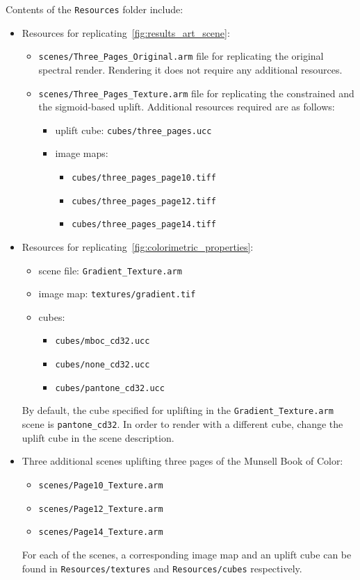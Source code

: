 Contents of the \texttt{Resources} folder include:
\begin{itemize}
	
	\item Resources for replicating~\cref{fig:results_art_scene}:
	\begin{itemize}
		\item \texttt{scenes/Three\_Pages\_Original.arm} file for replicating the original spectral render. Rendering it does not require any additional resources.
		\item \texttt{scenes/Three\_Pages\_Texture.arm} file for replicating the constrained and the sigmoid-based uplift. 
		Additional resources required are as follows:
		\begin{itemize}
			\item uplift cube: \texttt{cubes/three\_pages.ucc}
			\item image maps:
			\begin{itemize}
				\item[] \texttt{cubes/three\_pages\_page10.tiff}
				\item[] \texttt{cubes/three\_pages\_page12.tiff}
				\item[] \texttt{cubes/three\_pages\_page14.tiff}
			\end{itemize}
		\end{itemize}
	\end{itemize}

	\item Resources for replicating~\cref{fig:colorimetric_properties}:
	\begin{itemize}
		\item scene file: \texttt{Gradient\_Texture.arm}
		\item image map: \texttt{textures/gradient.tif}
		\item cubes: 
		\begin{itemize}
			\item[] \texttt{cubes/mboc\_cd32.ucc}
			\item[] \texttt{cubes/none\_cd32.ucc}
			\item[] \texttt{cubes/pantone\_cd32.ucc}
		\end{itemize}
	\end{itemize}
	By default, the cube specified for uplifting in the \texttt{Gradient\_Texture.arm} scene is \texttt{pantone\_cd32}. In order to render with a different cube, change the uplift cube in the scene description.
	
	\item Three additional scenes uplifting three pages of the Munsell Book of Color:
	\begin{itemize}
		\item \texttt{scenes/Page10\_Texture.arm}
		\item \texttt{scenes/Page12\_Texture.arm}
		\item \texttt{scenes/Page14\_Texture.arm}
	\end{itemize}
	For each of the scenes, a corresponding image map and an uplift cube can be found in \texttt{Resources/textures} and \texttt{Resources/cubes} respectively.
\end{itemize}